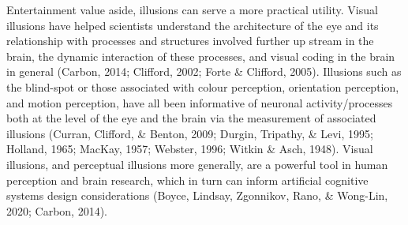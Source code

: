 \documentclass[
  english,
  man,floatsintext]{apa6}
\begin{document}
Entertainment value aside, illusions can serve a more practical utility. Visual illusions have helped scientists understand the architecture of the eye and its relationship with processes and structures involved further up stream in the brain, the dynamic interaction of these processes, and visual coding in the brain in general (Carbon, 2014; Clifford, 2002; Forte \& Clifford, 2005). Illusions such as the blind-spot or those associated with colour perception, orientation perception, and motion perception, have all been informative of neuronal activity/processes both at the level of the eye and the brain via the measurement of associated illusions (Curran, Clifford, \& Benton, 2009; Durgin, Tripathy, \& Levi, 1995; Holland, 1965; MacKay, 1957; Webster, 1996; Witkin \& Asch, 1948). Visual illusions, and perceptual illusions more generally, are a powerful tool in human perception and brain research, which in turn can inform artificial cognitive systems design considerations (Boyce, Lindsay, Zgonnikov, Rano, \& Wong-Lin, 2020; Carbon, 2014).
\end{document}
